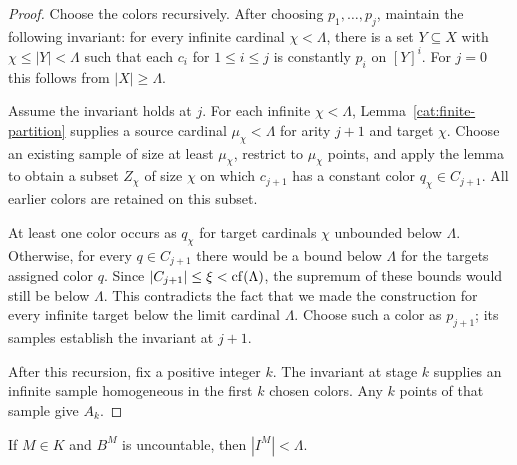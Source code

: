 \begin{proof}
Choose the colors recursively. After choosing $p_1,\ldots,p_j$,
maintain the following invariant: for every infinite cardinal
$\chi<\Lambda$, there is a set $Y\subseteq X$ with
$\chi\le|Y|<\Lambda$ such that each $c_i$ for $1\le i\le j$
is constantly $p_i$ on $[Y]^i$. For $j=0$ this follows from
$|X|\ge\Lambda$.

Assume the invariant holds at $j$. For each infinite
$\chi<\Lambda$, Lemma~\ref{cat:finite-partition} supplies a source
cardinal $\mu_\chi<\Lambda$ for arity $j+1$ and target $\chi$.
Choose an existing sample of size at least $\mu_\chi$, restrict to
$\mu_\chi$ points, and apply the lemma to obtain a subset
$Z_\chi$ of size $\chi$ on which $c_{j+1}$ has a constant color
$q_\chi\in C_{j+1}$. All earlier colors are retained on this subset.

At least one color occurs as $q_\chi$ for target cardinals
$\chi$ unbounded below $\Lambda$. Otherwise, for every
$q\in C_{j+1}$ there would be a bound below $\Lambda$ for the
targets assigned color $q$. Since $|C_{j+1}|\le\xi<\operatorname{cf}(\Lambda)$,
the supremum of these bounds would still be below $\Lambda$.
This contradicts the fact that we made the construction for every
infinite target below the limit cardinal $\Lambda$. Choose such a
color as $p_{j+1}$; its samples establish the invariant at $j+1$.

After this recursion, fix a positive integer $k$. The invariant at
stage $k$ supplies an infinite sample homogeneous in the first $k$
chosen colors. Any $k$ points of that sample give $A_k$.
\end{proof}

\begin{proposition}\label{cat:bounded}
If $M\in K$ and $B^M$ is uncountable, then $|I^M|<\Lambda$.
\end{proposition}

